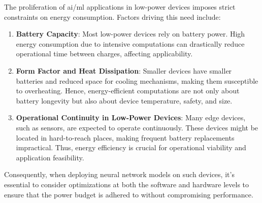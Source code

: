 \begin{itemize}
	The proliferation of \gls{ai}/\gls{ml} applications in low-power devices imposes strict constraints on energy consumption. Factors driving this need include:
	
	\begin{enumerate}
		\item \textbf{Battery Capacity}: Most low-power devices rely on battery power. High energy consumption due to intensive computations can drastically reduce operational time between charges, affecting applicability.
		
		\item \textbf{Form Factor and Heat Dissipation}: Smaller devices have smaller batteries and reduced space for cooling mechanisms, making them susceptible to overheating. Hence, energy-efficient computations are not only about battery longevity but also about device temperature, safety, and size.
		
		\item \textbf{Operational Continuity in Low-Power Devices}: Many edge devices, such as sensors, are expected to operate continuously. These devices might be located in hard-to-reach places, making frequent battery replacements impractical. Thus, energy efficiency is crucial for operational viability and application feasibility.
	\end{enumerate}
	
	Consequently, when deploying neural network models on such devices, it's essential to consider optimizations at both the software and hardware levels to ensure that the power budget is adhered to without compromising performance.
	
\end{itemize}

